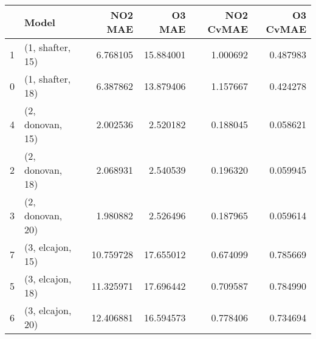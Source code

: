 \begin{tabular}{llrrrr}
\toprule
{} &             Model &    NO2 MAE &     O3 MAE &  NO2 CvMAE &  O3 CvMAE \\
\midrule
1 &  (1, shafter, 15) &   6.768105 &  15.884001 &   1.000692 &  0.487983 \\
0 &  (1, shafter, 18) &   6.387862 &  13.879406 &   1.157667 &  0.424278 \\
4 &  (2, donovan, 15) &   2.002536 &   2.520182 &   0.188045 &  0.058621 \\
2 &  (2, donovan, 18) &   2.068931 &   2.540539 &   0.196320 &  0.059945 \\
3 &  (2, donovan, 20) &   1.980882 &   2.526496 &   0.187965 &  0.059614 \\
7 &  (3, elcajon, 15) &  10.759728 &  17.655012 &   0.674099 &  0.785669 \\
5 &  (3, elcajon, 18) &  11.325971 &  17.696442 &   0.709587 &  0.784990 \\
6 &  (3, elcajon, 20) &  12.406881 &  16.594573 &   0.778406 &  0.734694 \\
\bottomrule
\end{tabular}
